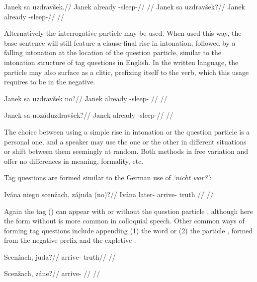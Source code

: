 \pex
\a
\begingl
\gla Janek sa uzdrav\v{s}ek.//
\glb Janek already -sleep-//
\glft {}//
\endgl
\a
\begingl
\gla Janek sa uzdrav\v{s}ek?//
\glb Janek already -sleep-//
\glft {}//
\endgl
\xe

Alternatively the interrogative particle  may be used. When used this way, the base sentence will still feature a clause-final rise in intonation, followed by a falling intonation at the location of the question particle, similar to the intonation structure of tag questions in English. In the written language, the particle  may also surface as a clitic, prefixing itself to the verb, which this usage requires to be in the negative.

\pex
\begingl
\gla Janek sa uzdrav\v{s}ek no?//
\glb Janek already -sleep- //
\glft {}//
\endgl
\xe

\pex
\begingl
\gla Janek sa noz\'aduzdrav\v{s}ek?//
\glb Janek already -sleep-//
\glft {}//
\endgl
\xe

The choice between using a simple rise in intonation or the question particle  is a personal one, and a speaker may use the one or the other in different situations or shift between them seemingly at random. Both methods in free variation and offer no differences in meaning, formality, etc.

Tag questions are formed similar to the German use of \emph{`nicht war?'}:

\pex
\begingl
\gla Iv\'ana niegu scen\v{z}ach, z\'ajuda (no)?//
\glb Iv\'ana later- arrive- truth //
\glft {}//
\endgl
\xe

Again the tag  () can appear with or without the question particle , although here the form without  is more common in colloquial speech. Other common ways of forming tag questions include appending (1) the word   or (2) the particle , formed from the negative prefix  and the expletive .

\pex
\a
\begingl
\gla Scen\v{z}ach, juda?//
\glb arrive- truth//
\glft {}//
\endgl

\a
\begingl
\gla Scen\v{z}ach, z\'ane?//
\glb arrive- //
\glft {}//
\endgl
\xe

